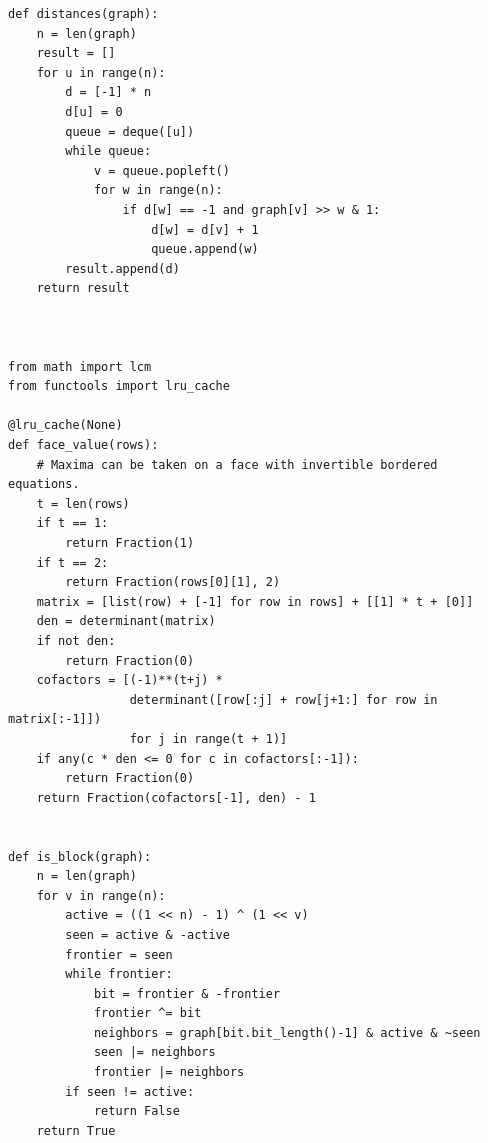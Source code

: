 \documentclass[11pt,a4paper]{article}
\begin{document}
\begin{Verbatim}[fontsize=\scriptsize]
def distances(graph):
    n = len(graph)
    result = []
    for u in range(n):
        d = [-1] * n
        d[u] = 0
        queue = deque([u])
        while queue:
            v = queue.popleft()
            for w in range(n):
                if d[w] == -1 and graph[v] >> w & 1:
                    d[w] = d[v] + 1
                    queue.append(w)
        result.append(d)
    return result



from math import lcm
from functools import lru_cache

@lru_cache(None)
def face_value(rows):
    # Maxima can be taken on a face with invertible bordered equations.
    t = len(rows)
    if t == 1:
        return Fraction(1)
    if t == 2:
        return Fraction(rows[0][1], 2)
    matrix = [list(row) + [-1] for row in rows] + [[1] * t + [0]]
    den = determinant(matrix)
    if not den:
        return Fraction(0)
    cofactors = [(-1)**(t+j) *
                 determinant([row[:j] + row[j+1:] for row in matrix[:-1]])
                 for j in range(t + 1)]
    if any(c * den <= 0 for c in cofactors[:-1]):
        return Fraction(0)
    return Fraction(cofactors[-1], den) - 1


def is_block(graph):
    n = len(graph)
    for v in range(n):
        active = ((1 << n) - 1) ^ (1 << v)
        seen = active & -active
        frontier = seen
        while frontier:
            bit = frontier & -frontier
            frontier ^= bit
            neighbors = graph[bit.bit_length()-1] & active & ~seen
            seen |= neighbors
            frontier |= neighbors
        if seen != active:
            return False
    return True



\end{Verbatim}
\end{document}
